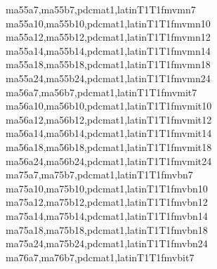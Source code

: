 





\installfonts
        {ma55a7,ma55b7,pdcmat1,latin}{T1}{T1}{fmv}{m}{n}{7}
        {ma55a10,ma55b10,pdcmat1,latin}{T1}{T1}{fmv}{m}{n}{10}
        {ma55a12,ma55b12,pdcmat1,latin}{T1}{T1}{fmv}{m}{n}{12}
        {ma55a14,ma55b14,pdcmat1,latin}{T1}{T1}{fmv}{m}{n}{14}
        {ma55a18,ma55b18,pdcmat1,latin}{T1}{T1}{fmv}{m}{n}{18}
        {ma55a24,ma55b24,pdcmat1,latin}{T1}{T1}{fmv}{m}{n}{24}
        {ma56a7,ma56b7,pdcmat1,latin}{T1}{T1}{fmv}{m}{it}{7}
        {ma56a10,ma56b10,pdcmat1,latin}{T1}{T1}{fmv}{m}{it}{10}
        {ma56a12,ma56b12,pdcmat1,latin}{T1}{T1}{fmv}{m}{it}{12}
        {ma56a14,ma56b14,pdcmat1,latin}{T1}{T1}{fmv}{m}{it}{14}
        {ma56a18,ma56b18,pdcmat1,latin}{T1}{T1}{fmv}{m}{it}{18}
        {ma56a24,ma56b24,pdcmat1,latin}{T1}{T1}{fmv}{m}{it}{24}
        {ma75a7,ma75b7,pdcmat1,latin}{T1}{T1}{fmv}{b}{n}{7}
        {ma75a10,ma75b10,pdcmat1,latin}{T1}{T1}{fmv}{b}{n}{10}
        {ma75a12,ma75b12,pdcmat1,latin}{T1}{T1}{fmv}{b}{n}{12}
        {ma75a14,ma75b14,pdcmat1,latin}{T1}{T1}{fmv}{b}{n}{14}
        {ma75a18,ma75b18,pdcmat1,latin}{T1}{T1}{fmv}{b}{n}{18}
        {ma75a24,ma75b24,pdcmat1,latin}{T1}{T1}{fmv}{b}{n}{24}
        {ma76a7,ma76b7,pdcmat1,latin}{T1}{T1}{fmv}{b}{it}{7}
